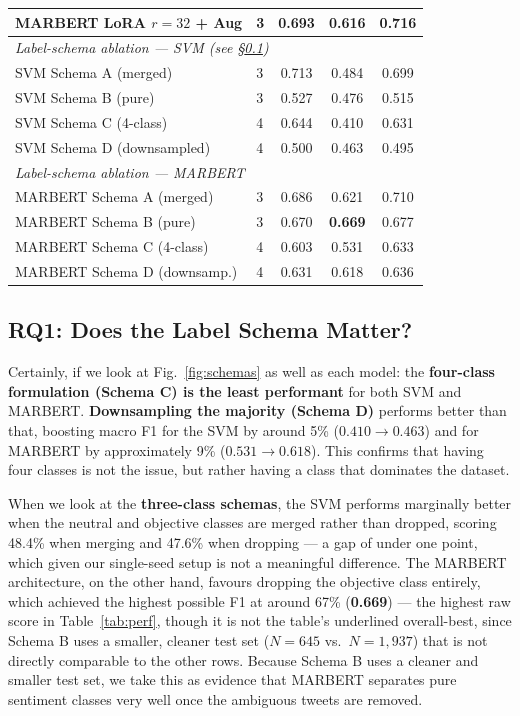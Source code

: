 \documentclass[conference]{IEEEtran}
\begin{document}
\begin{table}[t]
\begin{tabular}{llccc}
    MARBERT LoRA $r{=}32$ + Aug & 3 & 0.693 & 0.616 & 0.716 \\
    \midrule
    \multicolumn{5}{l}{\textit{Label-schema ablation --- SVM (see \S\ref{sec:rq1})}}\\
    SVM Schema A (merged)       & 3 & 0.713 & 0.484 & 0.699 \\
    SVM Schema B (pure)         & 3 & 0.527 & 0.476 & 0.515 \\
    SVM Schema C (4-class)      & 4 & 0.644 & 0.410 & 0.631 \\
    SVM Schema D (downsampled)  & 4 & 0.500 & 0.463 & 0.495 \\
    \midrule
    \multicolumn{5}{l}{\textit{Label-schema ablation --- MARBERT}}\\
    MARBERT Schema A (merged)   & 3 & 0.686 & 0.621 & 0.710 \\
    MARBERT Schema B (pure)     & 3 & 0.670 & \textbf{0.669} & 0.677 \\
    MARBERT Schema C (4-class)  & 4 & 0.603 & 0.531 & 0.633 \\
    MARBERT Schema D (downsamp.)& 4 & 0.631 & 0.618 & 0.636 \\
    \bottomrule
  \end{tabular}
\end{table}

\subsection{RQ1: Does the Label Schema Matter?}
\label{sec:rq1}
Certainly, if we look at Fig.~\ref{fig:schemas} as well as each model:
the \textbf{four-class formulation (Schema C) is the least performant} for both SVM and
MARBERT. \textbf{Downsampling the majority (Schema D)} performs better than that, boosting macro F1 for
the SVM by around 5\% ($0.410\!\to\!0.463$) and for MARBERT by approximately 9\% ($0.531\!\to\!0.618$).
This confirms that having four classes is not the issue, but rather having a class that dominates the
dataset.

When we look at the \textbf{three-class schemas}, the SVM performs marginally better when the neutral
and objective classes are merged rather than dropped, scoring 48.4\% when merging and 47.6\% when
dropping --- a gap of under one point, which given our single-seed setup is not a meaningful
difference. The MARBERT architecture, on the other hand, favours dropping the objective class
entirely, which achieved the highest possible F1 at around 67\% (\textbf{0.669}) --- the highest raw
score in Table~\ref{tab:perf}, though it is not the table's underlined overall-best, since Schema B
uses a smaller, cleaner test set ($N{=}645$ vs.\ $N{=}1{,}937$) that is not directly comparable to
the other rows. Because Schema B uses a cleaner and smaller test set, we take this as evidence that
MARBERT separates pure sentiment classes very well once the ambiguous tweets are removed.
\end{document}
